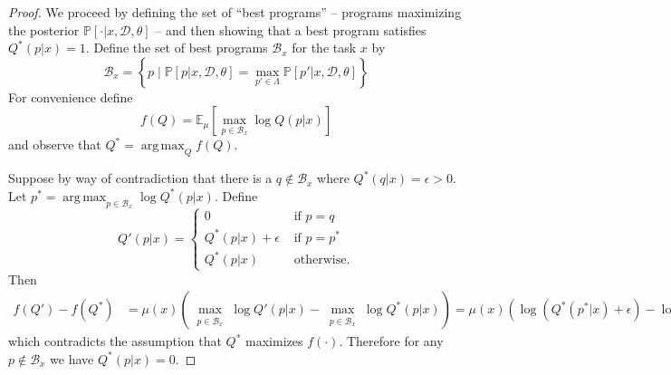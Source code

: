 \documentclass{article}
\DeclareMathOperator*{\argmax}{arg\,max} %
\newcommand{\expect}{\mathds{E}} %
\newcommand{\probability}{\mathds{P}} %
\begin{document}
 \begin{proof}
   We proceed by defining the set of ``best programs'' -- programs maximizing the posterior $\probability[\cdot |x,\mathcal{D},\theta]$ -- and then showing that a best program satisfies $Q^*(p|x) = 1$.
   Define the set of best programs $\mathcal{B}_x$ for the task $x$ by
   $$
\mathcal{B}_x = \left\{p\;|\;\probability[p|x,\mathcal{D},\theta] = \max_{p'\in \Lambda}\probability[p'|x,\mathcal{D},\theta] \right\}
$$
For convenience define
$$
f(Q) = \expect_\mu\left[\max_{p\in \mathcal{B}_x}\log Q(p|x) \right]
$$
and observe that $Q^* = \argmax_Q f(Q)$.


Suppose by way of contradiction that there is a $q\not\in \mathcal{B}_x $
where $Q^*(q|x) = \epsilon > 0$.
Let $p^*= \argmax_{p\in \mathcal{B}_x}\log Q^*(p|x)$.
Define
$$
Q'(p|x) = \begin{cases}
  0&\text{ if }p = q\\
  Q^*(p|x) + \epsilon&\text{ if }p = p^*\\
  Q^*(p|x)&\text{ otherwise.}
\end{cases}
$$
Then
\begin{align*}
  f(Q') - f(Q^*) &= \mu(x) \left(\max_{\substack{p\in \mathcal{B}_x}}\log  Q'(p|x) - \max_{\substack{p\in \mathcal{B}_x}}\log  Q^*(p|x) \right) = \mu(x)\left(\log \left(Q^*(p^*|x) + \epsilon \right) - \log Q^*(p^*|x) \right) > 0
\end{align*}
which contradicts the assumption that $Q^*$ maximizes $f(\cdot )$.
Therefore
for any $p\not\in \mathcal{B}_x$ we have
$Q^*(p|x) = 0$.


\end{proof}
\end{document}
